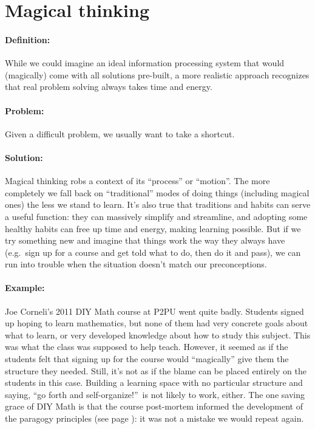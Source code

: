 \section{Magical thinking}
\paragraph{Definition:} While we could imagine an ideal information
processing system that would (magically) come with all solutions
pre-built, a more realistic approach recognizes that real problem
solving always takes time and energy.

\paragraph{Problem:} Given a difficult problem, we usually want to take a
shortcut.

\paragraph{Solution:} Magical thinking robs a context of its ``process'' or
``motion''. The more completely we fall back on ``traditional'' modes of
doing things (including magical ones) the less we stand to learn. It's
also true that traditions and habits can serve a useful function: they
can massively simplify and streamline, and adopting some healthy habits
can free up time and energy, making learning possible. But if we try
something new and imagine that things work the way they always have
(e.g.~sign up for a course and get told what to do, then do it and
pass), we can run into trouble when the situation doesn't match our
preconceptions.

\paragraph{Example:} Joe Corneli's 2011 DIY Math course at P2PU went quite
badly. Students signed up hoping to learn mathematics, but none of them
had very concrete goals about what to learn, or very developed knowledge
about how to study this subject. This was what the class was supposed to
help teach. However, it seemed as if the students felt that signing up
for the course would ``magically'' give them the structure they needed.
Still, it's not as if the blame can be placed entirely on the students
in this case. Building a learning space with no particular structure and
saying, ``go forth and self-organize!''~is not likely to work, either.
The one saving grace of DIY Math is that the course post-mortem informed
the development of the paragogy principles (see page \pageref{paragogy-principles}): it was not a mistake we
would repeat again.

